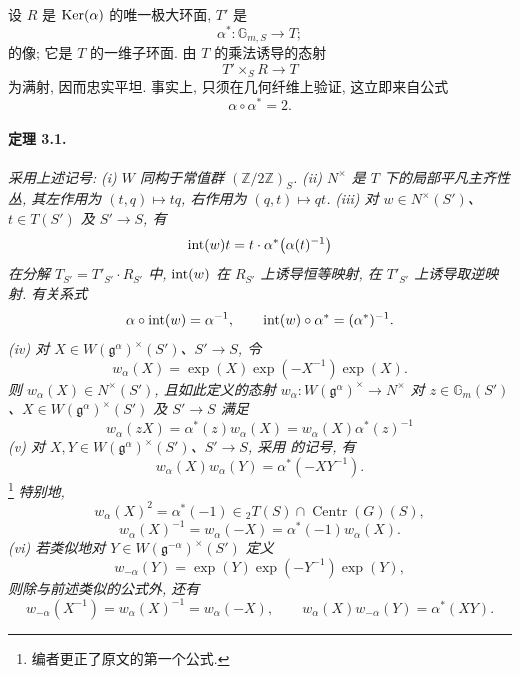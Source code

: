 设 \(R\) 是 \(\operatorname{Ker}(\alpha)\) 的唯一极大环面, \(T'\) 是
\[
  \alpha^\ast\colon\mathbb G_{m,S}\longrightarrow T;
\]
的像; 它是 \(T\) 的一维子环面. 由 \(T\) 的乘法诱导的态射
\[
  T'\times_S R\longrightarrow T
\]
为满射, 因而忠实平坦. 事实上, 只须在几何纤维上验证, 这立即来自公式
\[
  \alpha\circ\alpha^\ast=2.
\]

\paragraph{\textbf{定理 3.1.}}
\emph{采用上述记号:}
\smallskip
\noindent\emph{\textup{(i)} \(W\) 同构于常值群 \((\mathbb Z/2\mathbb Z)_S\).}
\smallskip
\noindent\emph{\textup{(ii)} \(N^\times\) 是 \(T\) 下的局部平凡主齐性丛, 其左作用为 \((t,q)\mapsto tq\), 右作用为 \((q,t)\mapsto qt\).}
\smallskip
\noindent\emph{\textup{(iii)} 对 \(w\in N^\times(S')\)、\(t\in T(S')\) 及 \(S'\to S\), 有}
\[
  \operatorname{int}(w)t=t\cdot\alpha^\ast\bigl(\alpha(t)^{-1}\bigr)
\]
\emph{在分解 \(T_{S'}=T'_{S'}\cdot R_{S'}\) 中, \(\operatorname{int}(w)\) 在 \(R_{S'}\) 上诱导恒等映射, 在 \(T'_{S'}\) 上诱导取逆映射. 有关系式}
\[
  \alpha\circ\operatorname{int}(w)=\alpha^{-1},
  \qquad
  \operatorname{int}(w)\circ\alpha^\ast=(\alpha^\ast)^{-1}.
\]
\smallskip
\noindent\emph{\textup{(iv)} 对 \(X\in W(\mathfrak g^\alpha)^\times(S')\)、\(S'\to S\), 令}
\[
  w_\alpha(X)
    =\exp(X)\exp(-X^{-1})\exp(X).
\]
\emph{则 \(w_\alpha(X)\in N^\times(S')\), 且如此定义的态射 \(w_\alpha\colon W(\mathfrak g^\alpha)^\times\to N^\times\) 对 \(z\in\mathbb G_m(S')\)、\(X\in W(\mathfrak g^\alpha)^\times(S')\) 及 \(S'\to S\) 满足}
\[
  w_\alpha(zX)
    =\alpha^\ast(z)w_\alpha(X)
    =w_\alpha(X)\alpha^\ast(z)^{-1}
\]
\smallskip
\noindent\emph{\textup{(v)} 对 \(X,Y\in W(\mathfrak g^\alpha)^\times(S')\)、\(S'\to S\), 采用  的记号, 有}
\[
  w_\alpha(X)w_\alpha(Y)=\alpha^\ast(-XY^{-1}).
\]
\footnote{编者更正了原文的第一个公式.}
\emph{特别地,}
\[
  w_\alpha(X)^2
    =\alpha^\ast(-1)
    \in {}_2T(S)\cap\operatorname{Centr}(G)(S),
\]
\[
  w_\alpha(X)^{-1}
    =w_\alpha(-X)
    =\alpha^\ast(-1)w_\alpha(X).
\]
\smallskip
\noindent\emph{\textup{(vi)} 若类似地对 \(Y\in W(\mathfrak g^{-\alpha})^\times(S')\) 定义}
\[
  w_{-\alpha}(Y)
    =\exp(Y)\exp(-Y^{-1})\exp(Y),
\]
\emph{则除与前述类似的公式外, 还有}
\[
  w_{-\alpha}(X^{-1})
    =w_\alpha(X)^{-1}
    =w_\alpha(-X),
\qquad
  w_\alpha(X)w_{-\alpha}(Y)=\alpha^\ast(XY).
\]

